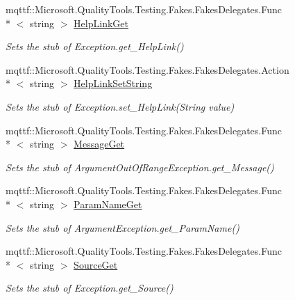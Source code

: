 \begin{DoxyCompactItemize}
mqttf\-::\-Microsoft.\-Quality\-Tools.\-Testing.\-Fakes.\-Fakes\-Delegates.\-Func\\*
$<$ string $>$ \hyperlink{class_system_1_1_fakes_1_1_stub_argument_out_of_range_exception_aa6a9bf471d00e42637cc56a162eef3d8}{Help\-Link\-Get}
\begin{DoxyCompactList}\small\item\em Sets the stub of Exception.\-get\-\_\-\-Help\-Link()\end{DoxyCompactList}\item 
mqttf\-::\-Microsoft.\-Quality\-Tools.\-Testing.\-Fakes.\-Fakes\-Delegates.\-Action\\*
$<$ string $>$ \hyperlink{class_system_1_1_fakes_1_1_stub_argument_out_of_range_exception_af561fdae04c02d3f28136a839befafa6}{Help\-Link\-Set\-String}
\begin{DoxyCompactList}\small\item\em Sets the stub of Exception.\-set\-\_\-\-Help\-Link(\-String value)\end{DoxyCompactList}\item 
mqttf\-::\-Microsoft.\-Quality\-Tools.\-Testing.\-Fakes.\-Fakes\-Delegates.\-Func\\*
$<$ string $>$ \hyperlink{class_system_1_1_fakes_1_1_stub_argument_out_of_range_exception_a1d001b2fe42a0313bc7479270cada11c}{Message\-Get}
\begin{DoxyCompactList}\small\item\em Sets the stub of Argument\-Out\-Of\-Range\-Exception.\-get\-\_\-\-Message()\end{DoxyCompactList}\item 
mqttf\-::\-Microsoft.\-Quality\-Tools.\-Testing.\-Fakes.\-Fakes\-Delegates.\-Func\\*
$<$ string $>$ \hyperlink{class_system_1_1_fakes_1_1_stub_argument_out_of_range_exception_a78fda915c93ae728a10691eb80357337}{Param\-Name\-Get}
\begin{DoxyCompactList}\small\item\em Sets the stub of Argument\-Exception.\-get\-\_\-\-Param\-Name()\end{DoxyCompactList}\item 
mqttf\-::\-Microsoft.\-Quality\-Tools.\-Testing.\-Fakes.\-Fakes\-Delegates.\-Func\\*
$<$ string $>$ \hyperlink{class_system_1_1_fakes_1_1_stub_argument_out_of_range_exception_a89b38f8a8246f672bc4533fe18198d57}{Source\-Get}
\begin{DoxyCompactList}\small\item\em Sets the stub of Exception.\-get\-\_\-\-Source()\end{DoxyCompactList}\item 

\end{DoxyCompactItemize}
